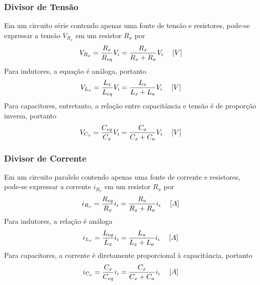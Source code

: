 \documentclass{article}
\numberwithin{equation}{section}
\begin{document}
    \subsubsection{Divisor de Tensão} %
    \label{subsubsec:divten}
    Em um circuito série contendo apenas uma fonte de tensão e resistores, pode-se expressar a tensão $V_{R_x}$ em um resistor $R_{x}$ por
    \begin{equation}
        V_{R_x}=\frac{R_{x}}{R_{eq}}V_{i}=\frac{R_{x}}{R_{x}+R_{a}}V_{i} \hspace{0.45cm}[V]
    \end{equation}
    Para indutores, a equação é análoga, portanto
    \begin{equation}
        V_{L_x}=\frac{L_{x}}{L_{eq}}V_{i}=\frac{L_{x}}{L_{x}+L_{a}}V_{i} \hspace{0.45cm}[V]
    \end{equation}
    Para capacitores, entretanto, a relação entre capacitância e tensão é de proporção inversa, portanto
    \begin{equation}
        V_{C_x}=\frac{C_{eq}}{C_{x}}V_{i}=\frac{C_{a}}{C_{x}+C_{a}}V_{i} \hspace{0.45cm}[V]
    \end{equation}

    \subsubsection{Divisor de Corrente}
    \label{subsubsec:divcor}
    Em um circuito paralelo contendo apenas uma fonte de corrente e resistores, pode-se expressar a corrente $i_{R_x}$ em um resistor $R_{x}$ por
    \begin{equation}
        i_{R_x}=\frac{R_{eq}}{R_{x}}i_{i}=\frac{R_{a}}{R_{x}+R_{a}}i_{i} \hspace{0.45cm}[A]
    \end{equation}
    Para indutores, a relação é análoga
    \begin{equation}
        i_{L_x}=\frac{L_{eq}}{L_{x}}i_{i}=\frac{L_{a}}{L_{x}+L_{a}}i_{i} \hspace{0.45cm}[A]
    \end{equation}
    Para capacitores, a corrente é diretamente proporcional à capacitância, portanto
    \begin{equation}
        i_{C_x}=\frac{C_{x}}{C_{eq}}i_{i}=\frac{C_{x}}{C_{x}+C_{a}}i_{i} \hspace{0.45cm}[A]
    \end{equation}
\end{document}

